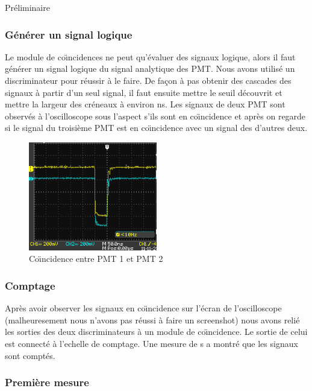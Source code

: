 \documentclass[a4paper,11pt,liststotocnumbered,bibtotocnumbered]{scrartcl}
\begin{document}
\begin{section}{Préliminaire}
   \subsubsection{Générer un signal logique}
      Le module de co\"{\i}ncidences ne peut qu'évaluer des signaux logique, alors il faut générer un signal logique du signal analytique des PMT. Nous avons utilisé un discriminateur pour réussir à le faire. De fa\c con à pas obtenir des cascades des signaux à partir d'un seul signal, il faut ensuite mettre le seuil découvrit et mettre la largeur des créneaux à environ \unit[600]{ns}. Les signaux de deux PMT sont observés à l'oscilloscope sous l'aspect s'ils sont en co\"{\i}ncidence et après on regarde si le signal du troisième PMT est en co\"{\i}ncidence avec un signal des d'autres deux.
    \begin{figure}
     \centering
     \includegraphics[width=0.5\textwidth]{bilder/coinvrai.png}
     \caption{Co\"{\i}ncidence entre PMT 1 et PMT 2}
    \end{figure}
  
   
  
   \subsubsection{Comptage}
    Après avoir observer les signaux en co\"{\i}ncidence sur l'écran de l'oscilloscope (malheuresement nous n'avons pas réussi à faire un screenshot) nous avons relié les sorties des deux discriminateurs à un module de co\"{\i}ncidence. Le sortie de celui est connecté à l'echelle de comptage. Une mesure de \unit[30]{s} a montré que les signaux sont comptés.
   
   
   \subsubsection{Première mesure}


\end{section}
\end{document}
